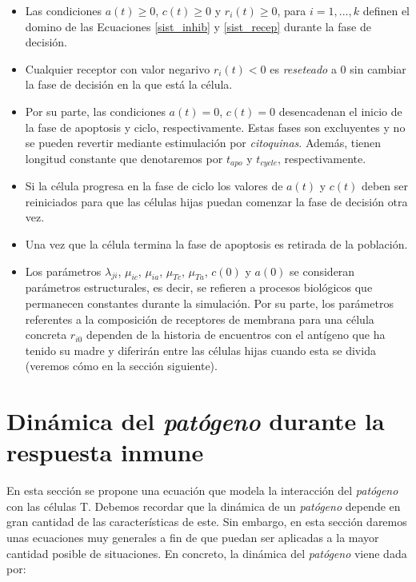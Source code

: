 \begin{itemize}
	\item Las condiciones $a(t)\geq0$, $c(t)\geq0$ y $r_i(t)\geq0$, para $i=1,...,k$ definen el domino de las Ecuaciones \ref{sist_inhib} y \ref{sist_recep} durante la fase de decisión. 
	
	\item Cualquier receptor con valor negarivo $r_i(t) < 0$ es \textit{reseteado} a $0$ sin cambiar la fase de decisión en la que está la célula.
	
	\item Por su parte, las condiciones $a(t)=0$, $c(t)=0$ desencadenan el inicio de la fase de apoptosis y ciclo, respectivamente. Estas fases son excluyentes y no se pueden revertir mediante estimulación por \textit{citoquinas}. Además, tienen longitud constante que denotaremos por $t_{apo}$ y $t_{cycle}$, respectivamente.
	
	\item Si la célula progresa en la fase de ciclo los valores de $a(t)$ y $c(t)$ deben ser reiniciados para que las células hijas puedan comenzar la fase de decisión otra vez. 
	
	\item Una vez que la célula termina la fase de apoptosis es retirada de la población.
	
	\item Los parámetros $\lambda_{ji}$, $\mu_{ic}$, $\mu_{ia}$, $\mu_{Tc}$, $\mu_{Ta}$, $c(0)$ y $a(0)$ se consideran parámetros estructurales, es decir, se refieren a procesos biológicos que permanecen constantes durante la simulación. Por su parte, los parámetros referentes a la composición de receptores de membrana para una célula concreta $r_{i0}$ dependen de la historia de encuentros con el antígeno que ha tenido su madre y diferirán entre las células hijas cuando esta se divida (veremos cómo en la sección siguiente).
\end{itemize}


\section{Dinámica del \textit{patógeno} durante la respuesta inmune}
\label{sec:modeloPatCelT}

En esta sección se propone una ecuación que modela la interacción del \textit{patógeno} con las células T. Debemos recordar que la dinámica de un \textit{patógeno} depende en gran cantidad de las características de este. Sin embargo, en esta sección daremos unas ecuaciones muy generales a fin de que puedan ser aplicadas a la mayor cantidad posible de situaciones. En concreto, la dinámica del \textit{patógeno} viene dada por:

